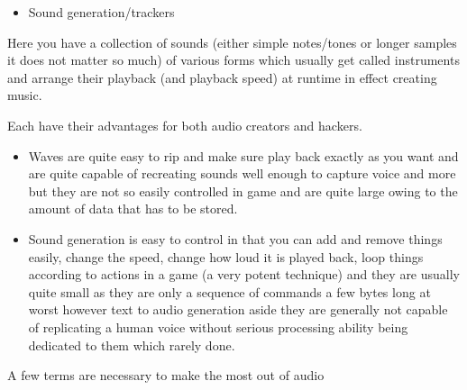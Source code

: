 \documentclass[
]{book}
\providecommand{\tightlist}{%
  \setlength{\itemsep}{0pt}\setlength{\parskip}{0pt}}
\begin{document}
\begin{itemize}
\tightlist
\item
  Sound generation/trackers
\end{itemize}

Here you have a collection of sounds (either simple notes/tones or longer samples it does not matter so much) of various forms which usually get called instruments and arrange their playback (and playback speed) at runtime in effect creating music.

Each have their advantages for both audio creators and hackers.

\begin{itemize}
\tightlist
\item
  Waves are quite easy to rip and make sure play back exactly as you want and are quite capable of recreating sounds well enough to capture voice and more but they are not so easily controlled in game and are quite large owing to the amount of data that has to be stored.
\item
  Sound generation is easy to control in that you can add and remove things easily, change the speed, change how loud it is played back, loop things according to actions in a game (a very potent technique) and they are usually quite small as they are only a sequence of commands a few bytes long at worst however text to audio generation aside they are generally not capable of replicating a human voice without serious processing ability being dedicated to them which rarely done.
\end{itemize}

A few terms are necessary to make the most out of audio
\end{document}
